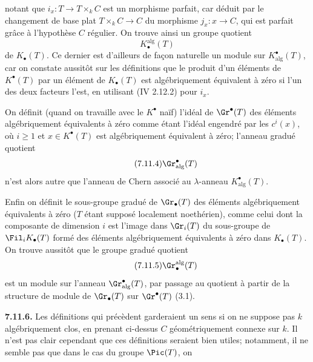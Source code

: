 notant que \(i_x:T\to T\times_k C\) est un morphisme parfait, car déduit par le changement de base plat \(T\times_k C\to C\) du morphisme \(j_x:x\to C\), qui est parfait grâce à l'hypothèse \(C\) régulier. On trouve ainsi un groupe quotient
\begin{equation}\tag{7.11.3}
  K_\bullet^{\mathrm{alg}}(T)
\end{equation}
de \(K_\bullet(T)\). Ce dernier est d'ailleurs de façon naturelle un module sur \(K^\bullet_{\mathrm{alg}}(T)\), car on constate aussitôt sur les définitions que le produit d'un éléments de \(K^\bullet(T)\) par un élément de \(K_\bullet(T)\) est algébriquement équivalent à zéro si l'un des deux facteurs l'est, en utilisant (IV 2.12.2) pour \(i_x\).

On définit (quand on travaille avec le \(K^\bullet\) naïf) l'idéal de \(\Gr^\bullet(T)\) des éléments algébriquement équivalents à zéro comme étant l'idéal engendré par les \(c^i(x)\), où \(i\geq1\) et \(x\in K^\bullet(T)\) est algébriquement équivalent à zéro; l'anneau gradué quotient
\begin{equation}\tag{7.11.4}
  \Gr^\bullet_{\mathrm{alg}}(T)
\end{equation}
n'est alors autre que l'anneau de Chern associé au \(\lambda\)-anneau \(K^\bullet_{\mathrm{alg}}(T)\).

Enfin on définit le sous-groupe gradué de \(\Gr_\bullet(T)\) des éléments algébriquement équivalents à zéro (\(T\) étant supposé localement noethérien), comme celui dont la composante de dimension \(i\) est l'image dans \(\Gr_i(T)\) du sous-groupe de \(\Fil_iK_\bullet(T)\) formé des éléments algébriquement équivalents à zéro dans \(K_\bullet(T)\). On trouve aussitôt que le groupe gradué quotient
\begin{equation}\tag{7.11.5}
  \Gr_\bullet^{\mathrm{alg}}(T)
\end{equation}
est un module sur l'anneau \(\Gr^\bullet_{\mathrm{alg}}(T)\), par passage au quotient à partir de la structure de module de \(\Gr_\bullet(T)\) sur \(\Gr^\bullet(T)\) (3.1).

\textbf{7.11.6.} Les définitions qui précèdent garderaient un sens si on ne suppose pas \(k\) algébriquement clos, en prenant ci-dessus \(C\) géométriquement connexe sur \(k\). Il n'est pas clair cependant que ces définitions seraient bien utiles; notamment, il ne semble pas que dans le cas du groupe \(\Pic(T)\), on
